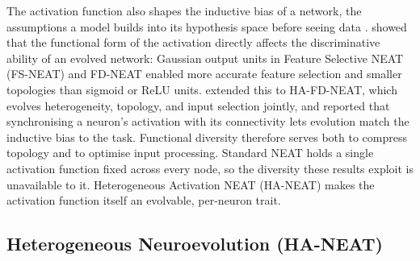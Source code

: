 \documentclass[12pt]{article}
\begin{document}
The activation function also shapes the inductive bias of a network, the assumptions a model builds into its hypothesis space before seeing data \parencite{papavasileiou_importance_2017}.
\textcite{papavasileiou_importance_2017} showed that the functional form of the activation directly affects the discriminative ability of an evolved network: Gaussian output units in Feature Selective NEAT (FS-NEAT) and FD-NEAT enabled more accurate feature selection and smaller topologies than sigmoid or ReLU units.
\textcite{papavasileiou_optimizing_2022} extended this to HA-FD-NEAT, which evolves heterogeneity, topology, and input selection jointly, and reported that synchronising a neuron's activation with its connectivity lets evolution match the inductive bias to the task.
Functional diversity therefore serves both to compress topology and to optimise input processing.
Standard NEAT holds a single activation function fixed across every node, so the diversity these results exploit is unavailable to it.
Heterogeneous Activation NEAT (HA-NEAT) makes the activation function itself an evolvable, per-neuron trait.




\subsection{Heterogeneous Neuroevolution (HA-NEAT)}
\label{subsec:haneat}
\end{document}
